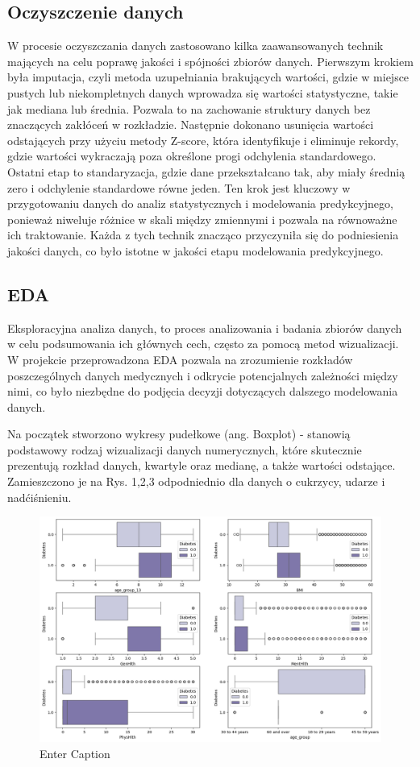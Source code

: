 \documentclass[onecolumn,12pt]{article}
\begin{document}
\subsection{Oczyszczenie danych}
W procesie oczyszczania danych zastosowano kilka zaawansowanych technik mających na celu poprawę jakości i spójności zbiorów danych. Pierwszym krokiem była imputacja, czyli metoda uzupełniania brakujących wartości, gdzie w miejsce pustych lub niekompletnych danych wprowadza się wartości statystyczne, takie jak mediana lub średnia. Pozwala to na zachowanie struktury danych bez znaczących zakłóceń w rozkładzie. Następnie dokonano usunięcia wartości odstających  przy użyciu metody Z-score, która identyfikuje i eliminuje rekordy, gdzie wartości wykraczają poza określone progi odchylenia standardowego. Ostatni etap to standaryzacja, gdzie dane przekształcano tak, aby miały średnią zero i odchylenie standardowe równe jeden. Ten krok jest kluczowy w przygotowaniu danych do analiz statystycznych i modelowania predykcyjnego, ponieważ niweluje różnice w skali między zmiennymi i pozwala na równoważne ich traktowanie. Każda z tych technik znacząco przyczyniła się do podniesienia jakości danych, co było istotne w jakości etapu modelowania predykcyjnego.

\subsection{EDA}

Eksploracyjna analiza danych, to proces analizowania i badania zbiorów danych w celu podsumowania ich głównych cech, często za pomocą metod wizualizacji. W projekcie przeprowadzona EDA pozwala na zrozumienie rozkładów poszczególnych danych medycznych i odkrycie potencjalnych zależności między nimi, co było niezbędne do podjęcia decyzji dotyczących dalszego modelowania danych.

Na początek stworzono wykresy pudełkowe (ang. Boxplot) - stanowią podstawowy rodzaj wizualizacji danych numerycznych, które skutecznie prezentują rozkład danych, kwartyle oraz medianę, a także wartości odstające. Zamieszczono je na Rys. 1,2,3 odpodniednio dla danych o cukrzycy, udarze i nadćiśnieniu. 

\begin{figure}
    \centering
    \includegraphics[width=1\linewidth]{raport/graphs/diabetes_boxplots.png}
    \caption{Enter Caption}
    \label{fig:enter-label}
\end{figure}
\end{document}
